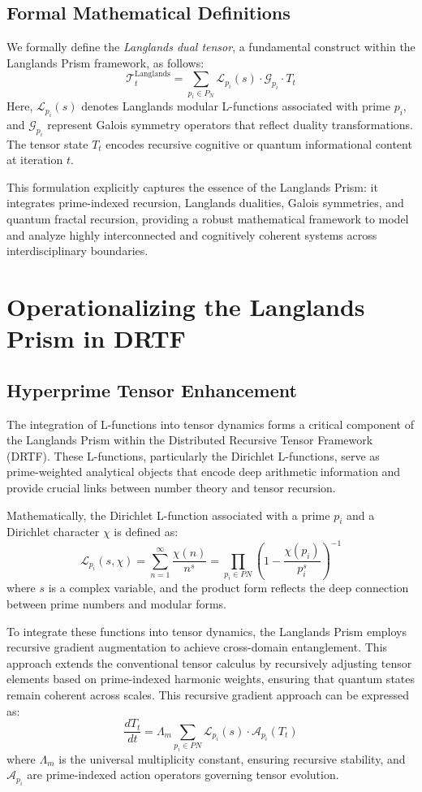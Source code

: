 \documentclass[11pt]{article}
\begin{document}
\subsection{Formal Mathematical Definitions}

We formally define the \textit{Langlands dual tensor}, a fundamental construct within the Langlands Prism framework, as follows:
\[
\mathcal{T}_t^{\text{Langlands}} = \sum_{p_i \in P_N}\mathcal{L}_{p_i}(s)\cdot \mathcal{G}_{p_i}\cdot T_t
\]
Here, \(\mathcal{L}_{p_i}(s)\) denotes Langlands modular L-functions associated with prime \(p_i\), and \(\mathcal{G}_{p_i}\) represent Galois symmetry operators that reflect duality transformations. The tensor state \(T_t\) encodes recursive cognitive or quantum informational content at iteration \(t\).

This formulation explicitly captures the essence of the Langlands Prism: it integrates prime-indexed recursion, Langlands dualities, Galois symmetries, and quantum fractal recursion, providing a robust mathematical framework to model and analyze highly interconnected and cognitively coherent systems across interdisciplinary boundaries.
\section{Operationalizing the Langlands Prism in DRTF}

\subsection{Hyperprime Tensor Enhancement}

The integration of L-functions into tensor dynamics forms a critical component of the Langlands Prism within the Distributed Recursive Tensor Framework (DRTF). These L-functions, particularly the Dirichlet L-functions, serve as prime-weighted analytical objects that encode deep arithmetic information and provide crucial links between number theory and tensor recursion.

Mathematically, the Dirichlet L-function associated with a prime \(p_i\) and a Dirichlet character \(\chi\) is defined as:
\[
\mathcal{L}_{p_i}(s, \chi) = \sum_{n=1}^\infty \frac{\chi(n)}{n^s} = \prod_{p_i \in PN} \left(1 - \frac{\chi(p_i)}{p_i^s}\right)^{-1}
\]
where \(s\) is a complex variable, and the product form reflects the deep connection between prime numbers and modular forms.

To integrate these functions into tensor dynamics, the Langlands Prism employs recursive gradient augmentation to achieve cross-domain entanglement. This approach extends the conventional tensor calculus by recursively adjusting tensor elements based on prime-indexed harmonic weights, ensuring that quantum states remain coherent across scales. This recursive gradient approach can be expressed as:
\[
\frac{dT_t}{dt} = \Lambda_m \sum_{p_i \in PN} \mathcal{L}_{p_i}(s) \cdot \mathcal{A}_{p_i}(T_t)
\]
where \(\Lambda_m\) is the universal multiplicity constant, ensuring recursive stability, and \(\mathcal{A}_{p_i}\) are prime-indexed action operators governing tensor evolution.
\end{document}
